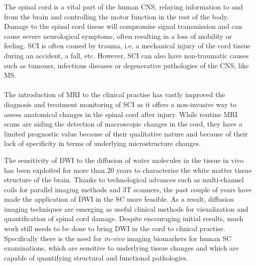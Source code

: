 The spinal cord is a vital part of the human \gls{CNS}, relaying information to and from the brain and controlling the motor function in the rest of the body. Damage to the spinal cord tissue will compromise signal transmission and can cause severe neurological symptoms, often resulting in a loss of mobility or feeling. \Gls{SCI} is often caused by trauma, i.e. a mechanical injury of the cord tissue during an accident, a fall, etc. However, \gls{SCI} can also have non-traumatic causes such as tumours, infectious diseases or degenerative pathologies of the \gls{CNS}, like \gls{MS}.
\paragraph{}
The introduction of \gls{MRI} to the clinical practise has vastly improved the diagnosis and treatment monitoring of \gls{SCI} as it offers a non-invasive way to assess anatomical changes in the spinal cord after injury. While routine \gls{MRI} scans are aiding the detection of macroscopic changes in the cord, they have a limited prognostic value because of their qualitative nature and because of their lack of specificity in terms of underlying microstructure changes. 

The sensitivity of {\gls{DWI}} to the diffusion of water molecules in the tissue in vivo has been exploited for more than 20 years to characterise the white matter tissue structure of the brain. Thanks to technological advances such as multi-channel coils for parallel imaging methods and 3T scanners, the past couple of years have made the application of \gls{DWI} in the {\gls{SC}} more feasible. As a result, diffusion imaging techniques are emerging as useful clinical methods for visualization and quantification of spinal cord damage. Despite encouraging initial results, much work still needs to be done to bring \gls{DWI} in the cord to clinical practise. Specifically there is the need for \emph{in-vivo} imaging biomarkers for human {\gls{SC}} examinations, which are sensitive to underlying tissue changes and which are capable of quantifying structural and functional pathologies.





